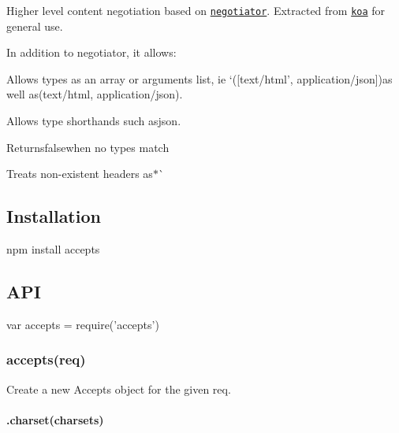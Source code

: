 \href{https://npmjs.org/package/accepts}{\tt } \href{https://npmjs.org/package/accepts}{\tt } \href{http://nodejs.org/download/}{\tt } \href{https://travis-ci.org/jshttp/accepts}{\tt } \href{https://coveralls.io/r/jshttp/accepts}{\tt }

Higher level content negotiation based on \href{https://www.npmjs.com/package/negotiator}{\tt negotiator}. Extracted from \href{https://www.npmjs.com/package/koa}{\tt koa} for general use.

In addition to negotiator, it allows\+:


\begin{DoxyItemize}
\item Allows types as an array or arguments list, ie `(\mbox{[}\textquotesingle{}text/html', \textquotesingle{}application/json\textquotesingle{}\mbox{]}){\ttfamily as well as}(\textquotesingle{}text/html\textquotesingle{}, \textquotesingle{}application/json\textquotesingle{}){\ttfamily .}
\item {\ttfamily Allows type shorthands such as}json{\ttfamily .}
\item {\ttfamily Returns}false{\ttfamily when no types match}
\item {\ttfamily Treats non-\/existent headers as}$\ast$\`{}
\end{DoxyItemize}

\subsection*{Installation}


\begin{DoxyCode}
npm install accepts
\end{DoxyCode}


\subsection*{A\+PI}


\begin{DoxyCode}
var accepts = require('accepts')
\end{DoxyCode}


\subsubsection*{accepts(req)}

Create a new {\ttfamily Accepts} object for the given {\ttfamily req}.

\paragraph*{.charset(charsets)}

